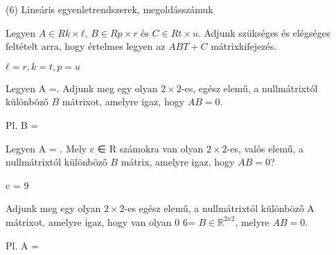 \begin{frame}[plain]
\begin{tcolorbox}[center, colback={myyellow}, coltext={black}, colframe={myyellow}]
    {\RHuge  (6) Lineáris egyenletrendszerek, megoldásszámuk}
    \mmedskip
\end{tcolorbox}
\end{frame}

\begin{frame}
  \begin{tcolorbox}[title={6/1. -N-}]
    Legyen $A ∈ Rk×ℓ$, $B ∈ Rp×r$ és $C ∈ Rt×u$. Adjunk szükséges és elégséges feltételt arra, hogy értelmes legyen az $ABT + C$ mátrixkifejezés.
  \tcblower

    \mmedskip 
    
    $ℓ = r, k = t, p = u$
  \end{tcolorbox}
\end{frame}


\begin{frame}
  \begin{tcolorbox}[title={6/2. -N-}]
    Legyen A =. Adjunk meg egy olyan $2×2$-es, egész elemű, a nullmátrixtól különböző $B$ mátrixot, amelyre igaz, hogy $AB = 0$.

  \tcblower

    \mmedskip 
    
    Pl. B =
  \end{tcolorbox}
\end{frame}


\begin{frame}
  \begin{tcolorbox}[title={6/3. -N-}]
     Legyen A = . Mely c ∈ R számokra van olyan $2×2$-es, valós elemű, a nullmátrixtól különböző $B$ mátrix, amelyre igaz, hogy $AB = 0$?
  \tcblower

    \mmedskip 
    
    c = 9
  \end{tcolorbox}
\end{frame}


\begin{frame}
  \begin{tcolorbox}[title={6/4. -N-}]
     Adjunk meg egy olyan $2×2$-es egész elemű, a nullmátrixtól különböző A mátrixot, amelyre igaz, hogy van olyan 0 6= $B ∈ \mathbb{R}^{2 x 2}$, melyre $AB = 0$.
  \tcblower

    \mmedskip 
    
    Pl. A =
  \end{tcolorbox}
\end{frame}


